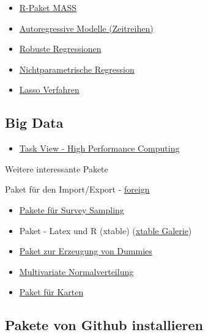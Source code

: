 \documentclass[]{article}
\providecommand{\tightlist}{%
  \setlength{\itemsep}{0pt}\setlength{\parskip}{0pt}}
\begin{document}
\begin{itemize}
\item
  \href{http://cran.r-project.org/web/packages/MASS/MASS.pdf}{R-Paket
  MASS}
\item
  \href{http://cran.r-project.org/web/packages/tsDyn/vignettes/tsDyn.pdf}{Autoregressive
  Modelle (Zeitreihen)}
\item
  \href{http://robustbase.r-forge.r-project.org/}{Robuste Regressionen}
\item
  \href{http://journal.r-project.org/archive/2012-2/RJournal_2012-2_Nie+S~Racine.pdf}{Nichtparametrische
  Regression}
\item
  \href{http://web.stanford.edu/~hastie/glmnet/glmnet_alpha.html}{Lasso
  Verfahren}
\end{itemize}

\subsection{Big Data}\label{big-data}

\begin{itemize}
\tightlist
\item
  \href{http://cran.r-project.org/web/views/HighPerformanceComputing.html}{Task
  View - High Performance Computing}
\end{itemize}

Weitere interessante Pakete

Paket für den Import/Export -
\href{http://cran.r-project.org/web/packages/foreign/foreign.pdf}{foreign}

\begin{itemize}
\item
  \href{http://iase-web.org/documents/papers/icots8/ICOTS8_4J1_TILLE.pdf}{Pakete
  für Survey Sampling}
\item
  Paket - Latex und R (xtable)
  (\href{http://cran.r-project.org/web/packages/xtable/vignettes/xtableGallery.pdf}{xtable
  Galerie})
\item
  \href{http://cran.r-project.org/web/packages/dummies/dummies.pdf}{Paket
  zur Erzeugung von Dummies}
\item
  \href{http://cran.r-project.org/web/packages/mvtnorm/index.html}{Multivariate
  Normalverteilung}
\item
  \href{http://www.r-bloggers.com/tag/maptools/}{Paket für Karten}
\end{itemize}

\subsection{Pakete von Github
installieren}\label{pakete-von-github-installieren}
\end{document}
